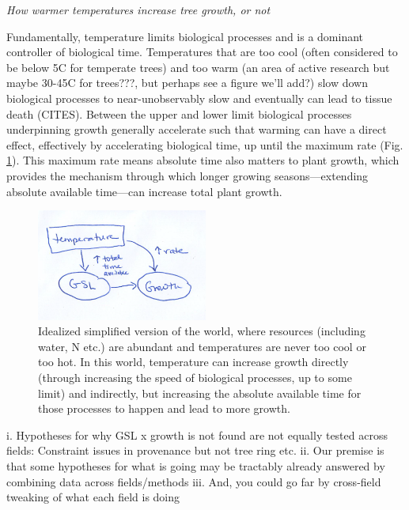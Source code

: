 \documentclass[11pt]{article}
\begin{document}
\emph{How warmer temperatures increase tree growth, or not}

Fundamentally, temperature limits biological processes and is a dominant controller of biological time. Temperatures that are too cool (often considered to be below 5C for temperate trees) and too warm (an area of active research but maybe 30-45C for trees???, but perhaps see a figure we'll add?) slow down biological processes to near-unobservably slow and eventually can lead to tissue death (CITES). Between the upper and lower limit biological processes underpinning growth generally accelerate such that warming can have a direct effect, effectively by accelerating biological time, up until the maximum rate (Fig. \ref{fig:concepbiotime}). This maximum rate means absolute time also matters to plant growth, which provides the mechanism through which longer growing seasons---extending absolute available time---can increase total plant growth. %
 
\newpage
\begin{figure}[h!]
\includegraphics[width=0.5\textwidth]{..//figures/gsltogrowth/gsltogrowth_emw1a.png}
\caption{Idealized simplified version of the world, where resources (including water, N etc.) are abundant and temperatures are never too cool or too hot. In this world, temperature can increase growth directly (through increasing the speed of biological processes, up to some limit) and indirectly, but increasing the absolute available time for those processes to happen and lead to more growth.}
\label{fig:concepbiotime}
\end{figure}

i. Hypotheses for why GSL x growth is not found are not equally tested across fields: Constraint issues in provenance but not tree ring etc.
ii. Our premise is that some hypotheses for what is going may be tractably already answered by combining data across fields/methods
iii. And, you could go far by cross-field tweaking of what each field is doing
\end{document}
